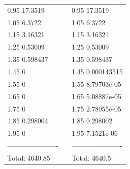 \documentclass[12pt,a4paper]{article}
\theoremstyle{dotless}
\begin{document}
\begin{appendix}
\begin {center}
\begin{tabular}{lcl}
  0.95       17.3519&&  0.95       17.3519\\
  1.05        6.3722&&  1.05        6.3722\\
  1.15       3.16321&&  1.15       3.16321\\
  1.25       0.53009&&  1.25       0.53009\\
  1.35      0.598437&&  1.35      0.598437\\
  1.45             0&&  1.45   0.000143515\\
  1.55             0&&  1.55   8.79703e-05\\
  1.65             0&&  1.65   5.08887e-05\\
  1.75             0&&  1.75   2.78955e-05\\
  1.85      0.298004&&  1.85      0.298002\\
  1.95             0&&  1.95    7.1521e-06\\
----------------------&&----------------------\\
Total:       4640.85&&Total:        4640.5\\
\end{tabular}
\end{center}

\newpage

\begin {center}
\begin{tabular}{lcl}


\end{tabular}
\end{center}
\end{appendix}
\end{document}

